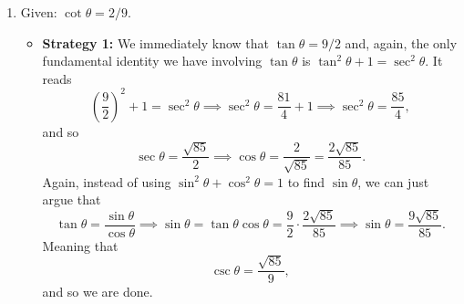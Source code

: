 \documentclass{ximera}
\begin{document}
\begin{example}
\begin{enumerate}[label=\alph*.]
  \item Given: $\cot\theta = 2/9$.

    \begin{explanation}
      \begin{itemize}
      \item {\bf Strategy 1:} We immediately know that $\tan \theta = 9/2$ and, again, the only fundamental identity we have involving $\tan\theta$ is $\tan^2\theta+1=\sec^2\theta$. It reads $$\left(\frac{9}{2}\right)^2 + 1 = \sec^2\theta \implies \sec^2\theta = \frac{81}{4} + 1 \implies \sec^2\theta = \frac{85}{4},$$and so $$\sec\theta = \frac{\sqrt{85}}{2} \implies \cos\theta = \frac{2}{\sqrt{85}} = \frac{2\sqrt{85}}{85}.$$Again, instead of using $\sin^2\theta+\cos^2\theta=1$ to find $\sin\theta$, we can just argue that $$\tan\theta = \frac{\sin\theta}{\cos\theta} \implies \sin\theta = \tan\theta \cos\theta= \frac{9}{2}\cdot \frac{2\sqrt{85}}{85} \implies \sin\theta = \frac{9\sqrt{85}}{85}.$$Meaning that $$\csc\theta = \frac{\sqrt{85}}{9},$$and so we are done.


\end{itemize}
\end{explanation}
\end{enumerate}
\end{example}
\end{document}
